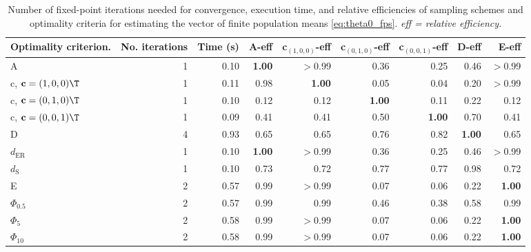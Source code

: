 \begin{table}[htb!]
\centering
\caption{Number of fixed-point iterations needed for convergence, execution time, and relative efficiencies of sampling schemes and optimality criteria for estimating the vector of finite population means \eqref{eq:theta0_fps}. \textit{eff = relative efficiency.}} 
\label{tab:finite_population_inference}
\begin{tabular}{lrrrrrrrr}
 Optimality criterion. & No. iterations & Time (s) & A-eff & c$_{(1,0,0)}$-eff & c$_{(0,1,0)}$-eff & c$_{(0,0,1)}$-eff & D-eff & E-eff \\ 
  \hline
A & 1 & 0.10 & \textbf{1.00} & $>$0.99 & 0.36 & 0.25 & 0.46 & $>$0.99 \\ 
  c, $\mathbf{c} = (1,0,0)\T$ & 1 & 0.11 & 0.98 & \textbf{1.00} & 0.05 & 0.04 & 0.20 & $>$0.99 \\ 
  c, $\mathbf{c} = (0,1,0)\T$ & 1 & 0.10 & 0.12 & 0.12 & \textbf{1.00} & 0.11 & 0.22 & 0.12 \\ 
  c, $\mathbf{c} = (0,0,1)\T$ & 1 & 0.09 & 0.41 & 0.41 & 0.50 & \textbf{1.00} & 0.70 & 0.41 \\ 
  D & 4 & 0.93 & 0.65 & 0.65 & 0.76 & 0.82 & \textbf{1.00} & 0.65 \\ 
  $d_{\mathrm{ER}}$ & 1 & 0.10 & \textbf{1.00} & $>$0.99 & 0.36 & 0.25 & 0.46 & $>$0.99 \\ 
  $d_{\mathrm{S}}$ & 1 & 0.10 & 0.73 & 0.72 & 0.77 & 0.77 & 0.98 & 0.72 \\ 
  E & 2 & 0.57 & 0.99 & $>$0.99 & 0.07 & 0.06 & 0.22 & \textbf{1.00} \\ 
  $\Phi_{0.5}$ & 2 & 0.57 & 0.99 & 0.99 & 0.46 & 0.38 & 0.58 & 0.99 \\ 
  $\Phi_5$ & 2 & 0.58 & 0.99 & $>$0.99 & 0.07 & 0.06 & 0.22 & \textbf{1.00} \\ 
  $\Phi_{10}$ & 2 & 0.58 & 0.99 & $>$0.99 & 0.07 & 0.06 & 0.22 & \textbf{1.00} \\ 
   \hline
\end{tabular}
\end{table}
